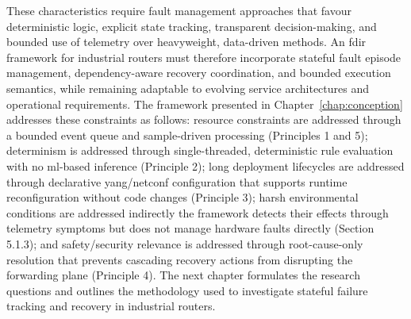 These characteristics require fault management approaches that favour deterministic logic, explicit state tracking, transparent decision-making, and bounded use of telemetry over heavyweight, data-driven methods. An \gls{fdir} framework for industrial routers must therefore incorporate stateful fault episode management, dependency-aware recovery coordination, and bounded execution semantics, while remaining adaptable to evolving service architectures and operational requirements. The framework presented in Chapter~\ref{chap:conception} addresses these constraints as follows: resource constraints are addressed through a bounded event queue and sample-driven processing (Principles 1 and 5); determinism is addressed through single-threaded, deterministic rule evaluation with no \gls{ml}-based inference (Principle 2); long deployment lifecycles are addressed through declarative \gls{yang}/\gls{netconf} configuration that supports runtime reconfiguration without code changes (Principle 3); harsh environmental conditions are addressed indirectly the framework detects their effects through telemetry symptoms but does not manage hardware faults directly (Section 5.1.3); and safety/security relevance is addressed through root-cause-only resolution that prevents cascading recovery actions from disrupting the forwarding plane (Principle 4). The next chapter formulates the research questions and outlines the methodology used to investigate stateful failure tracking and recovery in industrial routers.